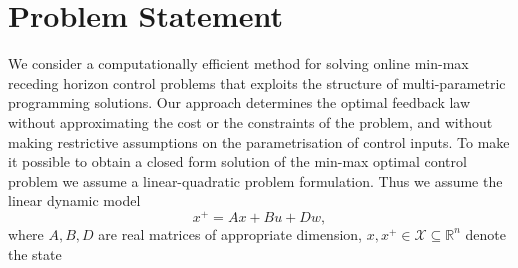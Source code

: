 \documentclass{ifacconf}
\begin{document}
\section{Problem Statement}\label{sec:problem:statement}
We consider a computationally efficient method for solving online min-max receding horizon control problems
that exploits the structure of multi-parametric programming solutions. Our approach determines the optimal
feedback law without approximating the cost or the constraints of the problem, and without making restrictive
assumptions on the parametrisation of control inputs.
%
%
To make it possible to obtain a closed form solution of the min-max optimal control problem we assume a
linear-quadratic problem formulation. Thus we assume the linear dynamic model 
\begin{equation}\label{eq:system:equation}
	x^+ = A x + B u + D w,
\end{equation}
%
where $A,B,D$ are real matrices of appropriate dimension, $x,  x^+\in\mathcal X\subseteq\mathbb R^n$ denote the state 
\end{document}
